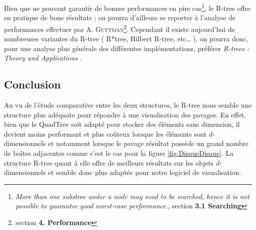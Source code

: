  Bien que ne pouvant garantir de bonnes performances en pire cas\footnote{\og \emph{More than one substree under a node may need to be searched, hence it is not possible to guarantee good worst-case performance.}\fg{}\cite{Guttman}, section \textbf{3.1 Searching}}, le R-tree offre en pratique de bons résultats ; on pourra d'ailleurs se reporter à l'analyse de performances effectuer par A. \textsc{Guttman}\footnote{section \textbf{4. Performance}\cite{Guttman}}. Cependant il existe aujourd'hui de nombreuses variantes du R-tree ( R*tree, Hilbert R-tree, etc\dots{} ), on pourra donc, pour une analyse plus générale des différentes implémentations, préférer \og\emph{R-trees : Theory and Applications} \fg{}\cite{poulos}.

\subsection{Conclusion}
Au vu de l'étude comparative entre les deux structures, le R-tree nous semble une structure plus adéquate pour répondre à une visualisation des pavages. En effet, bien que le QuadTree soit adapté pour stocker des éléments sans dimension, il devient moins performant et plus coûteux lorsque les éléments sont $d$-dimensionnels et notamment lorsque le pavage résultat possède un grand nombre de boîtes adjacentes comme c'est le cas pour la figure \ref{fig:DisqueDisque}. La structure R-tree quant à elle offre de meilleurs résultats sur les objets $d$-dimensionnels et semble donc plus adaptée pour notre logiciel de visualisation.